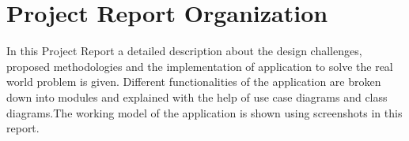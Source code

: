 \documentclass[../Report.tex]{subfiles}
\begin{document}
\section{Project Report Organization}

In this Project Report a detailed description about the design challenges, proposed methodologies and the implementation of application 
to solve the real world problem is given. Different functionalities of the application are broken down into modules and explained with 
the help of use case diagrams and class diagrams.The working model of the application is shown using screenshots in this report.\par
\end{document}
